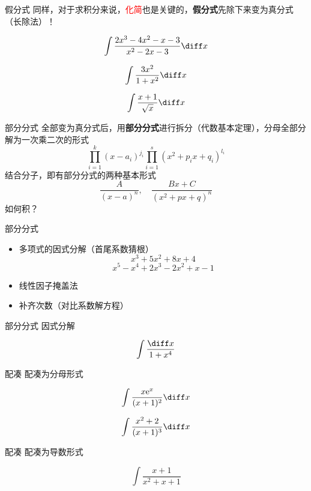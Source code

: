 \documentclass{myslide}
\begin{document}
\begin{frame}{假分式}
同样，对于求积分来说，{\large\textcolor{red}{化简}}也是关键的，\textbf{假分式}先除下来变为真分式（长除法）！
\begin{example}
\[\int\frac{2x^3-4x^2-x-3}{x^2-2x-3}\diff x\]
\end{example}
\begin{exercise}[\textsection 6.1/1(5)]
\[\int\frac{3x^2}{1+x^2}\diff x\]
\end{exercise}
\begin{exercise}[\textsection 6.1/1(6)]
\[\int\frac{x+1}{\sqrt{x}}\diff x\]
\end{exercise}
\end{frame}

\begin{frame}{部分分式}
全部变为真分式后，用\textbf{部分分式}进行拆分（代数基本定理），分母全部分解为一次乘二次的形式
\[\prod_{i=1}^k(x-a_i)^{j_i}\prod_{i=1}^s(x^2+p_ix+q_i)^{l_i}\]
结合分子，即有部分分式的两种基本形式
\[\frac{A}{(x-a)^n},\quad\frac{Bx+C}{(x^2+px+q)^n}\]
如何积？
\end{frame}

\begin{frame}{部分分式}
\begin{itemize}
	\item 多项式的因式分解（首尾系数猜根）
	\[x^3+5x^2+8x+4\]
	\[x^5-x^4+2x^3-2x^2+x-1\]
	\item 线性因子掩盖法
	\item 补齐次数（对比系数解方程）
\end{itemize}
\end{frame}

\begin{frame}{部分分式}
因式分解
\begin{example}
\[\int\frac{\diff x}{1+x^4}\]
\end{example}
\end{frame}

\begin{frame}{配凑}
配凑为分母形式
\begin{example}
\[\int\frac{x\mathrm{e}^x}{(x+1)^2}\diff x\]
\end{example}
\begin{exercise}
\[\int\frac{x^2+2}{(x+1)^3}\diff x\]
\end{exercise}
\end{frame}

\begin{frame}{配凑}
配凑为导数形式
\begin{example}
\[\int\frac{x+1}{x^2+x+1}\]
\end{example}
\end{frame}
\end{document}
